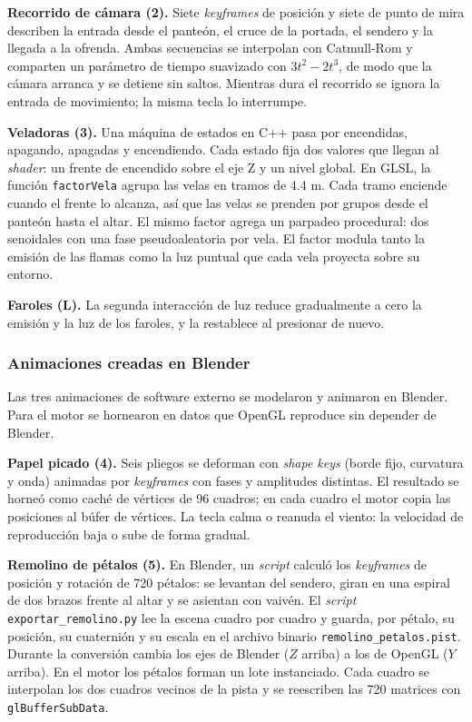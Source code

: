 \documentclass[letter,12pt]{article}
\begin{document}
	\textbf{Recorrido de cámara (2).} Siete \textit{keyframes} de posición y siete de punto de mira describen la entrada desde el panteón, el cruce de la portada, el sendero y la llegada a la ofrenda. Ambas secuencias se interpolan con Catmull-Rom y comparten un parámetro de tiempo suavizado con $3t^2 - 2t^3$, de modo que la cámara arranca y se detiene sin saltos. Mientras dura el recorrido se ignora la entrada de movimiento; la misma tecla lo interrumpe.

	\textbf{Veladoras (3).} Una máquina de estados en C++ pasa por encendidas, apagando, apagadas y encendiendo. Cada estado fija dos valores que llegan al \textit{shader}: un frente de encendido sobre el eje Z y un nivel global. En GLSL, la función \texttt{factorVela} agrupa las velas en tramos de 4.4 m. Cada tramo enciende cuando el frente lo alcanza, así que las velas se prenden por grupos desde el panteón hasta el altar. El mismo factor agrega un parpadeo procedural: dos senoidales con una fase pseudoaleatoria por vela. El factor modula tanto la emisión de las flamas como la luz puntual que cada vela proyecta sobre su entorno.

	\textbf{Faroles (L).} La segunda interacción de luz reduce gradualmente a cero la emisión y la luz de los faroles, y la restablece al presionar de nuevo.

	\subsubsection{Animaciones creadas en Blender}
	Las tres animaciones de software externo se modelaron y animaron en Blender. Para el motor se hornearon en datos que OpenGL reproduce sin depender de Blender.

	\textbf{Papel picado (4).} Seis pliegos se deforman con \textit{shape keys} (borde fijo, curvatura y onda) animadas por \textit{keyframes} con fases y amplitudes distintas. El resultado se horneó como caché de vértices de 96 cuadros; en cada cuadro el motor copia las posiciones al búfer de vértices. La tecla calma o reanuda el viento: la velocidad de reproducción baja o sube de forma gradual.

	\textbf{Remolino de pétalos (5).} En Blender, un \textit{script} calculó los \textit{keyframes} de posición y rotación de 720 pétalos: se levantan del sendero, giran en una espiral de dos brazos frente al altar y se asientan con vaivén. El \textit{script} \texttt{exportar\_remolino.py} lee la escena cuadro por cuadro y guarda, por pétalo, su posición, su cuaternión y su escala en el archivo binario \texttt{remolino\_petalos.pist}. Durante la conversión cambia los ejes de Blender ($Z$ arriba) a los de OpenGL ($Y$ arriba). En el motor los pétalos forman un lote instanciado. Cada cuadro se interpolan los dos cuadros vecinos de la pista y se reescriben las 720 matrices con \texttt{glBufferSubData}.
\end{document}
